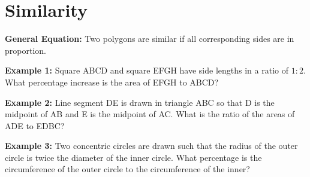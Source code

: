 \section{Similarity}

\textbf{General Equation:} Two polygons are similar if all corresponding sides are in proportion.

\vfill\textbf{Example 1:} Square ABCD and square EFGH have side lengths in a ratio of $1:2$. What percentage increase is the area of EFGH to ABCD?

\vfill\textbf{Example 2:} Line segment DE is drawn in triangle ABC so that D is the midpoint of AB and E is the midpoint of AC. What is the ratio of the areas of ADE to EDBC?

\vfill\textbf{Example 3:} Two concentric circles are drawn such that the radius of the outer circle is twice the diameter of the inner circle. What percentage is the circumference of the outer circle to the circumference of the inner?

